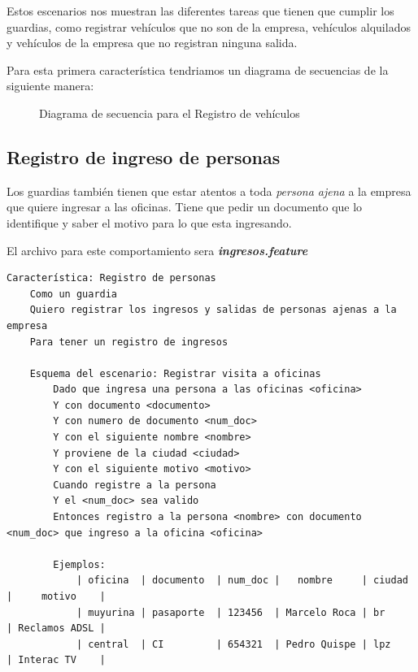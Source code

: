 Estos escenarios nos muestran las diferentes tareas que tienen que cumplir los
guardias, como registrar vehículos que no son de la empresa, vehículos alquilados
y vehículos de la empresa que no registran ninguna salida.

Para esta primera característica tendriamos un diagrama de secuencias de la
siguiente manera:

\begin{figure}[h]
  \begin{center}
    \def\svgwidth{\columnwidth}
    
    \caption[Diagrama de secuencia - Registro de vehículos]{
    Diagrama de secuencia para el Registro de vehículos}
  \end{center}
\end{figure}

\subsection{Registro de ingreso de personas}
Los guardias también tienen que estar atentos a toda {\it persona ajena} a la empresa
que quiere ingresar a las oficinas. Tiene que pedir un documento que lo identifique
y saber el motivo para lo que esta ingresando.

El archivo para este comportamiento sera {\it \bfseries ingresos.feature}

{\scriptsize
\begin{verbatim}
Característica: Registro de personas
    Como un guardia
    Quiero registrar los ingresos y salidas de personas ajenas a la empresa
    Para tener un registro de ingresos

    Esquema del escenario: Registrar visita a oficinas
        Dado que ingresa una persona a las oficinas <oficina>
        Y con documento <documento>
        Y con numero de documento <num_doc>
        Y con el siguiente nombre <nombre>
        Y proviene de la ciudad <ciudad>
        Y con el siguiente motivo <motivo>
        Cuando registre a la persona
        Y el <num_doc> sea valido
        Entonces registro a la persona <nombre> con documento <num_doc> que ingreso a la oficina <oficina>

        Ejemplos:
            | oficina  | documento  | num_doc |   nombre     | ciudad |     motivo    |
            | muyurina | pasaporte  | 123456  | Marcelo Roca | br     | Reclamos ADSL |
            | central  | CI         | 654321  | Pedro Quispe | lpz    | Interac TV    |
\end{verbatim}
}

